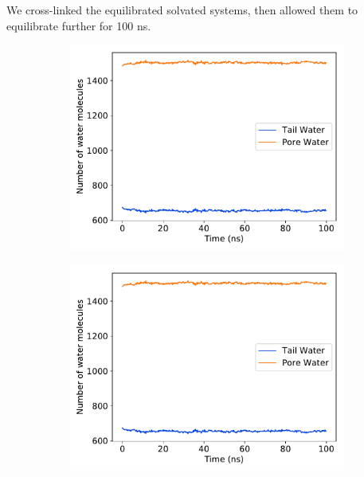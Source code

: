 \documentclass{article}
\begin{document}
  We cross-linked the equilibrated solvated systems, then allowed them to 
  equilibrate further for 100 ns. 

  \begin{figure}
  \centering
  \begin{subfigure}{0.45\textwidth}
  \includegraphics[width=\textwidth]{10wt_offset_xlinked_equil.pdf}
  \caption{}\label{fig:5wt_offset_xlinked_equil}
  \end{subfigure}
  \begin{subfigure}{0.45\textwidth}
  \includegraphics[width=\textwidth]{10wt_offset_xlinked_equil.pdf}
  \caption{}\label{fig:10wt_offset_xlinked_equil}
  \end{subfigure}
  \caption{}\label{fig:solvation_equilibration}
  \end{figure}
\end{document}
